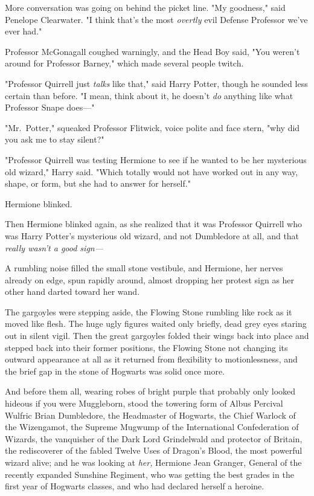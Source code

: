 More conversation was going on behind the picket line. "My goodness," said
Penelope Clearwater. "I think that's the most \emph{overtly} evil Defense
Professor we've ever had."

Professor McGonagall coughed warningly, and the Head Boy said, "You weren't
around for Professor Barney," which made several people twitch.

"Professor Quirrell just \emph{talks} like that," said Harry Potter, though he
sounded less certain than before. "I mean, think about it, he doesn't \emph{do}
anything like what Professor Snape does\mbox{---}"

"Mr.~Potter," squeaked Professor Flitwick, voice polite and face stern, "why
did you ask me to stay silent?"

"Professor Quirrell was testing Hermione to see if he wanted to be her
mysterious old wizard," Harry said. "Which totally would not have worked out in
any way, shape, or form, but she had to answer for herself."

Hermione blinked.

Then Hermione blinked again, as she realized that it was Professor Quirrell who
was Harry Potter's mysterious old wizard, and not Dumbledore at all, and that
\emph{really wasn't a good sign---}

A rumbling noise filled the small stone vestibule, and Hermione, her nerves
already on edge, spun rapidly around, almost dropping her protest sign as her
other hand darted toward her wand.

The gargoyles were stepping aside, the Flowing Stone rumbling like rock as it
moved like flesh. The huge ugly figures waited only briefly, dead grey eyes
staring out in silent vigil. Then the great gargoyles folded their wings back
into place and stepped back into their former positions, the Flowing Stone not
changing its outward appearance at all as it returned from flexibility to
motionlessness, and the brief gap in the stone of Hogwarts was solid once more.

And before them all, wearing robes of bright purple that probably only looked
hideous if you were Muggleborn, stood the towering form of Albus Percival
Wulfric Brian Dumbledore, the Headmaster of Hogwarts, the Chief Warlock of the
Wizengamot, the Supreme Mugwump of the International Confederation of Wizards,
the vanquisher of the Dark Lord Grindelwald and protector of Britain, the
rediscoverer of the fabled Twelve Uses of Dragon's Blood, the most powerful
wizard alive; and he was looking at \emph{her,} Hermione Jean Granger, General
of the recently expanded Sunshine Regiment, who was getting the best grades in
the first year of Hogwarts classes, and who had declared herself a heroine.

